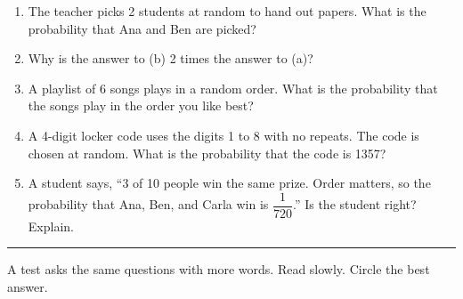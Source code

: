 \documentclass[11pt]{article}
\newcommand{\lessonhead}[1]{\par\vspace{0.6em}{\large\bfseries #1}\par\vspace{0.25em}\hrule\vspace{0.6em}}
\begin{document}
\begin{enumerate}[resume]
\begin{enumerate}
  \work{5em}
  \item The teacher picks 2 students at random to hand out papers. What is the probability that Ana and Ben are picked?

  \work{5em}
  \item Why is the answer to (b) 2 times the answer to (a)?

  \work{5em}
  \item A playlist of 6 songs plays in a random order. What is the probability that the songs play in the order you like best?

  \work{5em}
  \item A 4-digit locker code uses the digits 1 to 8 with no repeats. The code is chosen at random. What is the probability that the code is 1357?

  \work{5em}
  \item A student says, ``3 of 10 people win the same prize. Order matters, so the probability that Ana, Ben, and Carla win is $\dfrac{1}{720}$.'' Is the student right? Explain.

  \work{5em}
\end{enumerate}

\end{enumerate}

\newpage
\lessonhead{Test-Style Questions}
A test asks the same questions with more words. Read slowly. Circle the best answer.
\end{document}
